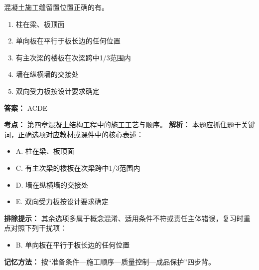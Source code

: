 \documentclass[UTF8,fontset=fandol,11pt]{ctexart}
\begin{document}
\begin{quizbox}[title={第 75 题}]
混凝土施工缝留置位置正确的有。\\
\begin{enumerate}[label=\Alph*.]
\item 柱在梁、板顶面
\item 单向板在平行于板长边的任何位置
\item 有主次梁的楼板在次梁跨中1/3范围内
\item 墙在纵横墙的交接处
\item 双向受力板按设计要求确定
\end{enumerate}
\textbf{答案：} ACDE
\vspace{0.25em}
\begin{answerbox}[title={考点解析}]
\textbf{考点：} 第四章混凝土结构工程中的施工工艺与顺序。
\textbf{解析：} 本题应抓住题干关键词，正确选项对应教材或课件中的核心表述：
\begin{itemize}
\item A. 柱在梁、板顶面
\item C. 有主次梁的楼板在次梁跨中1/3范围内
\item D. 墙在纵横墙的交接处
\item E. 双向受力板按设计要求确定
\end{itemize}
\textbf{排除提示：} 其余选项多属于概念混淆、适用条件不符或责任主体错误，复习时重点对照下列干扰项：
\begin{itemize}
\item B. 单向板在平行于板长边的任何位置
\end{itemize}
\textbf{记忆方法：} 按“准备条件—施工顺序—质量控制—成品保护”四步背。
\end{answerbox}
\end{quizbox}

\vspace{0.2em}
\end{document}
